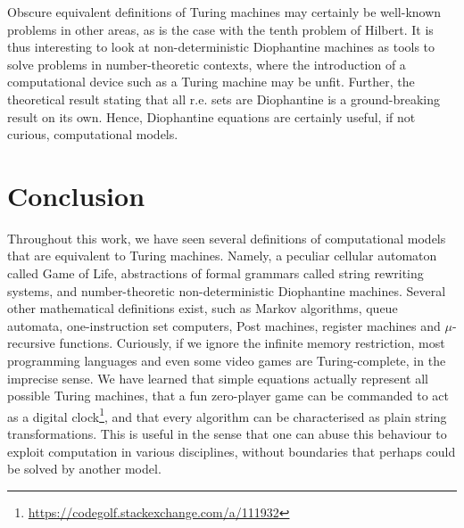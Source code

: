 \documentclass[12pt]{article}
\begin{document}
Obscure equivalent definitions of Turing machines may certainly be well-known
problems in other areas, as is the case with the tenth problem of Hilbert. It
is thus interesting to look at non-deterministic Diophantine machines as tools
to solve problems in number-theoretic contexts, where the introduction of a
computational device such as a Turing machine may be unfit. Further, the
theoretical result stating that all r.e. sets are Diophantine is a
ground-breaking result on its own. Hence, Diophantine equations are certainly
useful, if not curious, computational models.

\section{Conclusion}\label{sec:conc}

Throughout this work, we have seen several definitions of computational models
that are equivalent to Turing machines. Namely, a peculiar cellular automaton
called Game of Life, abstractions of formal grammars called string rewriting
systems, and number-theoretic non-deterministic Diophantine machines. Several
other mathematical definitions exist, such as Markov algorithms, queue
automata, one-instruction set computers, Post machines, register machines and
$\mu$-recursive functions. Curiously, if we ignore the infinite memory
restriction, most programming languages and even some video games are
Turing-complete, in the imprecise sense. We have learned that simple equations
actually represent all possible Turing machines, that a fun zero-player game
can be commanded to act as a digital
clock\footnote{\url{https://codegolf.stackexchange.com/a/111932}}, and that
every algorithm can be characterised as plain string transformations. This is
useful in the sense that one can abuse this behaviour to exploit computation in
various disciplines, without boundaries that perhaps could be solved by another
model.



\end{document}
